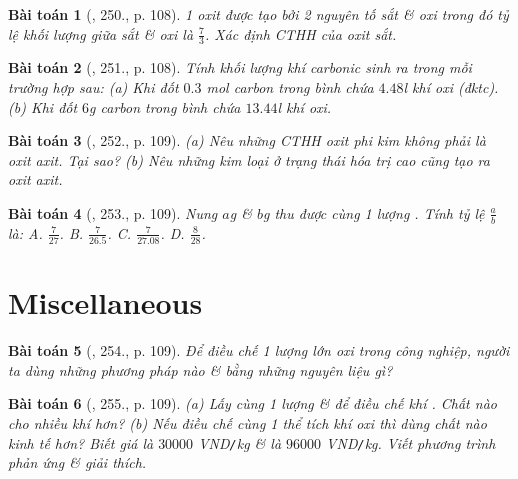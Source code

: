 \documentclass{article}
\newtheorem{baitoan}{Bài toán}
\begin{document}
\begin{baitoan}[\cite{An_400_BT_Hoa_Hoc_8_2020}, 250., p. 108]
	1 oxit được tạo bởi 2 nguyên tố sắt \& oxi trong đó tỷ lệ khối lượng giữa sắt \& oxi là $\frac{7}{3}$. Xác định CTHH của oxit sắt.
\end{baitoan}

\begin{baitoan}[\cite{An_400_BT_Hoa_Hoc_8_2020}, 251., p. 108]
	Tính khối lượng khí carbonic sinh ra trong mỗi trường hợp sau: (a) Khi đốt $0.3$ \emph{mol} carbon trong bình chứa $4.48$\emph{l} khí oxi (đktc). (b) Khi đốt $6$\emph{g} carbon trong bình chứa $13.44$\emph{l} khí oxi.
\end{baitoan}

\begin{baitoan}[\cite{An_400_BT_Hoa_Hoc_8_2020}, 252., p. 109]
	(a) Nêu những CTHH oxit phi kim không phải là oxit axit. Tại sao? (b) Nêu những kim loại ở trạng thái hóa trị cao cũng tạo ra oxit axit.
\end{baitoan}

\begin{baitoan}[\cite{An_400_BT_Hoa_Hoc_8_2020}, 253., p. 109]
	Nung $a$\emph{g} \emph{} \& $b$\emph{g} \emph{} thu được cùng 1 lượng \emph{}. Tính tỷ lệ $\frac{a}{b}$ là: {\sf A.} $\frac{7}{27}$. {\sf B.} $\frac{7}{26.5}$. {\sf C.} $\frac{7}{27.08}$. {\sf D.} $\frac{8}{28}$.
\end{baitoan}


\section{Miscellaneous}

\begin{baitoan}[\cite{An_400_BT_Hoa_Hoc_8_2020}, 254., p. 109]
	Để điều chế 1 lượng lớn oxi trong công nghiệp, người ta dùng những phương pháp nào \& bằng những nguyên liệu gì?
\end{baitoan}

\begin{baitoan}[\cite{An_400_BT_Hoa_Hoc_8_2020}, 255., p. 109]
	(a) Lấy cùng 1 lượng \emph{} \& \emph{} để điều chế khí \emph{}. Chất nào cho nhiều khí \emph{} hơn? (b) Nếu điều chế cùng 1 thể tích khí oxi thì dùng chất nào kinh tế hơn? Biết giá \emph{} là $30000$ \emph{VND\texttt{/}kg} \& \emph{} là $96000$ \emph{VND\texttt{/}kg}. Viết phương trình phản ứng \& giải thích.
\end{baitoan}
\end{document}
